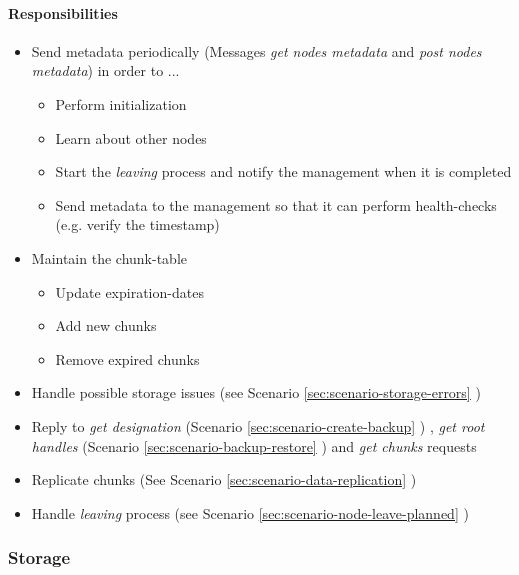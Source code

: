 \paragraph{Responsibilities}

\begin{itemize}
    \item Send \gls{metadata} periodically (Messages \emph{get nodes metadata} and \emph{post nodes metadata}) in order to ...
    \begin{itemize}
        \item Perform initialization
        \item Learn about other \glspl{node}
        \item Start the \emph{leaving} process and notify the \gls{management} when it is completed
        \item Send \gls{metadata} to the \gls{management} so that it can perform health-checks (e.g. verify the timestamp)
    \end{itemize}
    \item Maintain the \gls{chunk-table}
    \begin{itemize}
        \item Update \glspl{expiration-date}
        \item Add new \glspl{chunk}
        \item Remove expired \glspl{chunk}
    \end{itemize}
    \item Handle possible \gls{storage} issues (see Scenario \ref{sec:scenario-storage-errors} )
    \item Reply to \emph{get designation}  (Scenario \ref{sec:scenario-create-backup} ) , \emph{get root handles} (Scenario \ref{sec:scenario-backup-restore} ) and \emph{get chunks} requests
    \item Replicate \glspl{chunk} (See Scenario \ref{sec:scenario-data-replication} )
    \item Handle \emph{leaving} process (see Scenario \ref{sec:scenario-node-leave-planned} )
\end{itemize}

\subsubsection{Storage}\label{sec:component-storage}

